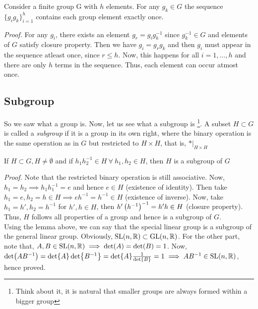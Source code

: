 \begin{ffact}
Consider a finite group G with $h$ elements. For any $g_k\in G$ the sequence $\{g_ig_k\}_{i=1}^h$ contains each group element exactly once. 
\end{ffact}
\textit{Proof.} For any $g_i$, there exists an element $g_r = g_ig_k^{-1}$ since $g_k^{-1}\in G$ and elements of $G$ satisfy closure property. Then we have $g_i = g_r g_k$ and then $g_i$ must appear in the sequence atleast once, since $r\leq h$. Now, this happens for all $i=1,\ldots,h$ and there are only $h$ terms in the sequence. Thus, each element can occur atmost once.
\subsection{Subgroup}
So we saw what a group is. Now, let us see what a subgroup is \footnote{Think about it, it is natural that smaller groups are always formed within a bigger group}. A subset $H\subset G$ is called a \textit{subgroup} if it is a group in its own right, where the binary operation is the same operation as in $G$ but restricted to $H\times H$, that is, $*\Big|_{H\times H}$
\begin{lemma}\label{lem:subgroup}
    If $H\subset G, H \neq \emptyset$ and if $h_1h_2^{-1}\in H\ \forall \ h_1,h_2\in H$, then $H$ is a subgroup of $G$
\end{lemma}
\textit{Proof.} Note that the restricted binary operation is still associative. Now, $h_1 = h_2 \implies h_1 h_1^{-1} = e$ and hence $e\in H$ (existence of identity). Then take $h_1 =e, h_2 = h \in H \implies eh^{-1} = h^{-1}\in H$ (existence of inverse). Now, take $h_1 = h', h_2 = h^{-1}$ for $h', h\in H$, then $h'\left( h^{-1} \right)^{-1}=h'h\in H$ (closure property). Thus, $H$ follows all properties of a group and hence is a subgroup of $G$.\\[0.3cm]
Using the lemma above, we can say that the special linear group is a subgroup of the general linear group. Obviously, $\mathrm{SL}(n,\mathbb{R})\subset \mathrm{GL}(n,\mathbb{R})$.  For the other part, note that,  $A,B\in \mathrm{SL}(n,\mathbb{R})\implies \det(A) = \det(B)=1$. Now, $\det(AB^{-1}) = \det{A}\det{B^{-1}} = \det{A}\frac{1}{\det{B}} = 1 \implies AB^{-1}\in \mathrm{SL}(n,\mathbb{R})$, hence proved.
